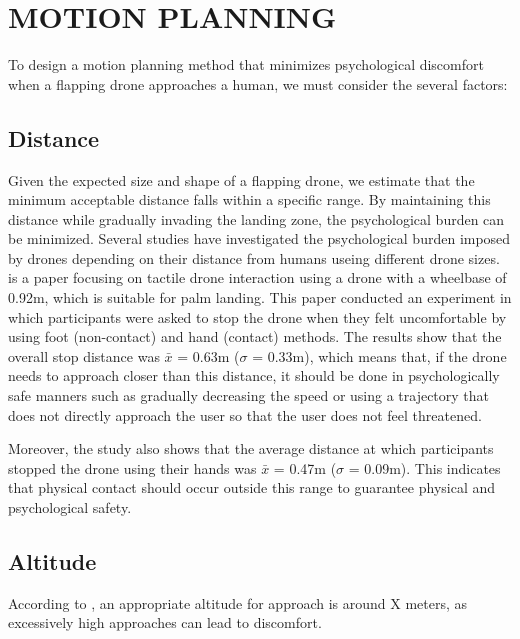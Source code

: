 \section{MOTION PLANNING}

To design a motion planning method that minimizes psychological discomfort when a flapping drone approaches a human, we must consider the several factors:

\subsection{Distance}

Given the expected size and shape of a flapping drone, we estimate that the minimum acceptable distance falls within a specific range. By maintaining this distance while gradually invading the landing zone, the psychological burden can be minimized.
Several studies have investigated the psychological burden imposed by drones depending on their distance from humans useing different drone sizes\cite{Yeh2017Proxemics, lieser2021evaluating-distances,Duncan2013comfortable-approach, Acharya2017robot-vs-drone-comfort}.
\cite{lieser2021evaluating-distances} is a paper focusing on tactile drone interaction using a drone with a wheelbase of 0.92m, which is suitable for palm landing.
This paper conducted an experiment in which participants were asked to stop the drone when they felt uncomfortable by using foot (non-contact) and hand (contact) methods.
The results show that the overall stop distance was $\bar{x}$ = 0.63m ($\sigma$ = 0.33m),
which means that, if the drone needs to approach closer than this distance, it should be done in psychologically safe manners such as gradually decreasing the speed or using a trajectory that does not directly approach the user so that the user does not feel threatened.

Moreover, the study \cite{lieser2021evaluating-distances} also shows that the average distance at which participants stopped the drone using their hands was $\bar{x}$ = 0.47m ($\sigma$ = 0.09m).
This indicates that physical contact should occur outside this range to guarantee physical and psychological safety.

\subsection{Altitude}

According to \cite{mdpi_2023}, an appropriate altitude for approach is around X meters, as excessively high approaches can lead to discomfort.


